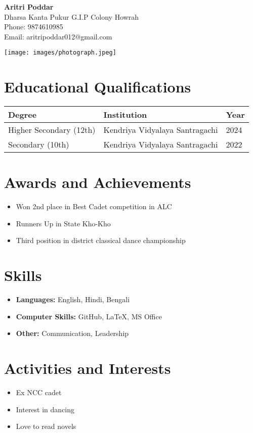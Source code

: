 \documentclass[11pt,a4paper]{article}
\begin{document}
\begin{minipage}{0.75\textwidth}
    \Huge\textbf{Aritri Poddar} \\[4pt]
    \normalsize
    Dharsa Kanta Pukur G.I.P Colony Howrah \\
    Phone: 9874610985 \\
    Email: aritripoddar012@gmail.com
\end{minipage}
\begin{minipage}{0.2\textwidth}
    \texttt{[image: images/photograph.jpeg]}
\end{minipage}

\vspace{1em}
\section*{Educational Qualifications}
\begin{tabularx}{\textwidth}{|X|X|X|}
    \hline
    \textbf{Degree} & \textbf{Institution} & \textbf{Year} \\
    \hline
    Higher Secondary (12th) & Kendriya Vidyalaya Santragachi & 2024 \\
    \hline
    Secondary (10th) & Kendriya Vidyalaya Santragachi & 2022 \\
    \hline
\end{tabularx}

\vspace{1em}
\section*{Awards and Achievements}
\begin{itemize}
    \item Won 2nd place in Best Cadet competition in ALC
    \item Runners Up in State Kho-Kho
    \item Third position in district classical dance championship
\end{itemize}

\vspace{1em}
\section*{Skills}
\begin{itemize}[leftmargin=1.5em]
    \item \textbf{Languages:} English, Hindi, Bengali
    \item \textbf{Computer Skills:} GitHub, LaTeX, MS Office
    \item \textbf{Other:} Communication, Leadership
\end{itemize}

\vspace{1em}
\section*{Activities and Interests }
\begin{itemize}[leftmargin=1.5em]
    \item Ex NCC cadet
    \item Interest in dancing
    \item Love to read novels
\end{itemize}
\end{document}
